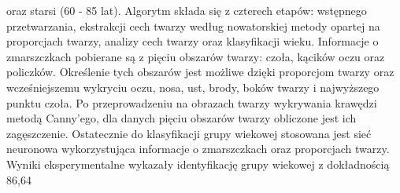 oraz starsi (60 - 85 lat). Algorytm składa się z czterech etapów: wstępnego przetwarzania, ekstrakcji cech twarzy według nowatorskiej metody opartej na proporcjach twarzy, analizy cech twarzy oraz klasyfikacji wieku. Informacje o zmarszczkach pobierane są z pięciu obszarów twarzy: czoła, kącików oczu oraz policzków. Określenie tych obszarów jest możliwe dzięki proporcjom twarzy oraz wcześniejszemu wykryciu oczu, nosa, ust, brody, boków twarzy i najwyższego punktu czoła. Po przeprowadzeniu na obrazach twarzy wykrywania krawędzi metodą Canny’ego, dla danych pięciu obszarów twarzy obliczone jest ich zagęszczenie. Ostatecznie do klasyfikacji grupy wiekowej stosowana jest sieć neuronowa wykorzystująca informacje o zmarszczkach oraz proporcjach twarzy. Wyniki eksperymentalne wykazały identyfikację grupy wiekowej z dokładnością 86,64%